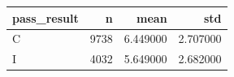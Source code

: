 \begin{tabular}{lrrr}
\toprule
pass\_result & n & mean & std \\
\midrule
C & 9738 & 6.449000 & 2.707000 \\
I & 4032 & 5.649000 & 2.682000 \\
\bottomrule
\end{tabular}
